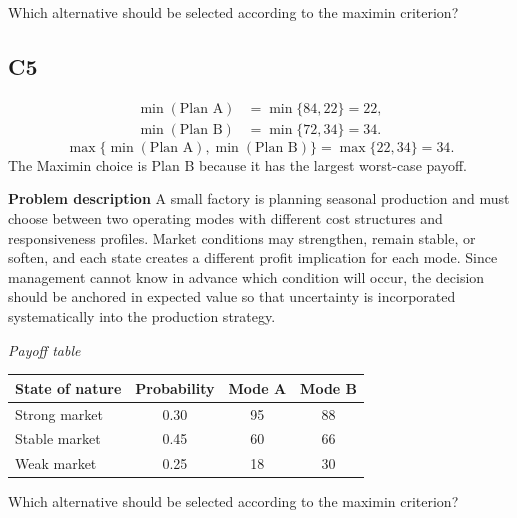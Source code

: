\begin{ExamProblems}
		Which alternative should be selected according to the maximin criterion?

		\subsection*{C5}
			\[
			\begin{aligned}
			\min(\text{Plan A}) &= \min\{84,22\} = 22,\\
			\min(\text{Plan B}) &= \min\{72,34\} = 34.
			\end{aligned}
			\]
			\[
			\max\{\min(\text{Plan A}), \min(\text{Plan B})\}
			= \max\{22, 34\}
			= 34.
			\]
			The Maximin choice is Plan B because it has the largest worst-case payoff.
		\item
		\textbf{Problem description}
		A small factory is planning seasonal production and must choose between two operating modes with different cost structures and responsiveness profiles. Market conditions may strengthen, remain stable, or soften, and each state creates a different profit implication for each mode. Since management cannot know in advance which condition will occur, the decision should be anchored in expected value so that uncertainty is incorporated systematically into the production strategy.

		\begin{center}
			\textit{Payoff table} \par
			\begin{tabular}{l c c c}
				\toprule
				State of nature & Probability & Mode A & Mode B \\
				\midrule
				Strong market & 0.30 & 95 & 88 \\
				Stable market & 0.45 & 60 & 66 \\
				Weak market & 0.25 & 18 & 30 \\
				\bottomrule
			\end{tabular}
		\end{center}

		Which alternative should be selected according to the maximin criterion?


\end{ExamProblems}
